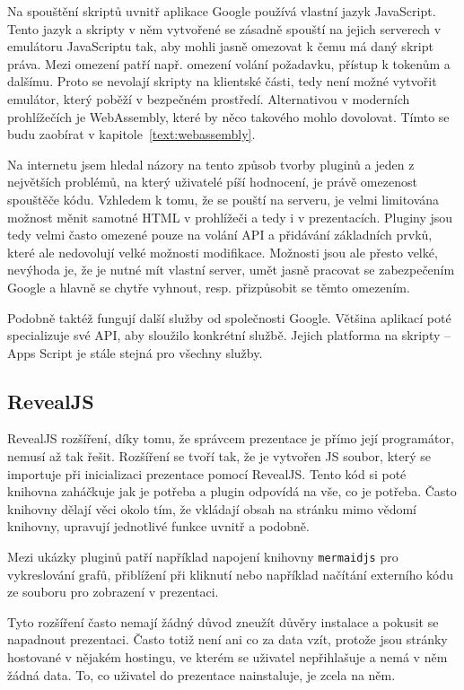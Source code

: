 Na spouštění skriptů uvnitř aplikace Google používá vlastní jazyk JavaScript.
Tento jazyk a skripty v něm vytvořené se zásadně spouští na jejich serverech v emulátoru JavaScriptu tak, aby mohli jasně omezovat k čemu má daný skript práva. 
Mezi omezení patří např. omezení volání požadavku, přístup k tokenům a dalšímu.
Proto se nevolají skripty na klientské části, tedy není možné vytvořit emulátor, který poběží v bezpečném prostředí.
Alternativou v moderních prohlížečích je WebAssembly, které by něco takového mohlo dovolovat.
Tímto se budu zaobírat v kapitole~\ref{text:webassembly}.

Na internetu jsem hledal názory na tento způsob tvorby pluginů a jeden z největších problémů, na který uživatelé píší hodnocení, je právě omezenost spouštěče kódu.
Vzhledem k tomu, že se pouští na serveru, je velmi limitována možnost měnit samotné HTML v prohlížeči a tedy i v prezentacích.
Pluginy jsou tedy velmi často omezené pouze na volání API a přidávání základních prvků, které ale nedovolují velké možnosti modifikace.
Možnosti jsou ale přesto velké, nevýhoda je, že je nutné mít vlastní server, umět jasně pracovat se zabezpečením Google a hlavně se chytře vyhnout, resp. přizpůsobit se těmto omezením.

Podobně taktéž fungují další služby od společnosti Google.
Většina aplikací poté specializuje své API, aby sloužilo konkrétní službě.
Jejich platforma na skripty -- Apps Script je stále stejná pro všechny služby.

\subsection{RevealJS}

RevealJS rozšíření, díky tomu, že správcem prezentace je přímo její programátor, nemusí až tak řešit.
Rozšíření se tvoří tak, že je vytvořen JS soubor, který se importuje při inicializaci prezentace pomocí RevealJS.
Tento kód si poté knihovna zaháčkuje jak je potřeba a plugin odpovídá na vše, co je potřeba.
Často knihovny dělají věci okolo tím, že vkládají obsah na stránku mimo vědomí knihovny, upravují jednotlivé funkce uvnitř a podobně.

Mezi ukázky pluginů patří například napojení knihovny \texttt{mermaidjs} pro vykreslování grafů, přiblížení při kliknutí nebo například načítání externího kódu ze souboru pro zobrazení v prezentaci.

Tyto rozšíření často nemají žádný důvod zneužít důvěry instalace a pokusit se napadnout prezentaci.
Často totiž není ani co za data vzít, protože jsou stránky hostované v nějakém hostingu, ve kterém se uživatel nepřihlašuje a nemá v něm žádná data.
To, co uživatel do prezentace nainstaluje, je zcela na něm.

